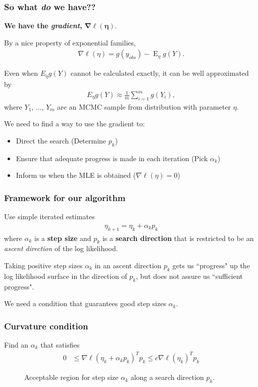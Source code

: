 \documentclass[slidestop,compress, 10pt]{beamer}
\DeclareMathOperator{\E}{E}
\begin{document}
\frame
{
\frametitle{So what \emph{do} we have??}
{\large \textbf{We have the \emph{gradient},} $\boldsymbol{\nabla \ell(\eta)}$.}
\vspace*{2mm}

By a nice property of exponential families,
\begin{align*}
	\nabla \ell( \eta ) = g(y_{obs}) - \E_{\eta} g(Y).
\end{align*}


Even when $E_\eta g(Y)$ cannot be calculated exactly, it can be well approximated by
\begin{align*}
E_\eta g(Y) \approx \frac{1}{m}\sum_{i = 1}^m g(Y_i),
\end{align*}
where $Y_1$, $\ldots$, $Y_m$ are an MCMC sample from distribution with parameter $\eta$.
\vspace*{4mm}

We need to find a way to use the gradient to: 
\vspace*{2mm}
\begin{itemize}
\item Direct the search  (Determine $p_k$)
\vspace*{2mm}

\item Ensure that adequate progress is made in each iteration  (Pick $\alpha_k$)
\vspace*{2mm}

\item Inform us when the MLE is obtained  ($\nabla \ell(\eta) = 0$)
\end{itemize}

}

\frame
{
\frametitle{Framework for our algorithm}
Use simple iterated estimates
\begin{align*}
	\eta_{k+1} = \eta_k + \alpha_k p_k
\end{align*}
where $\alpha_k$ is a \textbf{step size} and  $p_k$ is a \textbf{search direction} that
is restricted to be an \emph{ascent direction} of the log likelihood.

Taking positive step sizes $\alpha_k$ in an ascent direction $p_k$ gets us ``progress" up the log 
likelihood surface in the direction of $p_k$, but does not assure us ``sufficient progress".

We need a condition that guarantees good step sizes $\alpha_k$.
}


\frame
{
  \frametitle{Curvature condition}
Find an $\alpha_k$ that satisfies
\begin{align*}
	 0 & \leq \nabla \ell( \eta_k + \alpha_k p_k)^T p_k \leq c \nabla \ell(\eta_k)^T 
p_k
\end{align*}
\begin{figure}[h]
\centering
    \scalebox{.25}{}
	\caption{Acceptable region for step size $\alpha_k$ along a search direction $p_k$.}
\label{F:alpha_region}
\end{figure}
}
\end{document}
